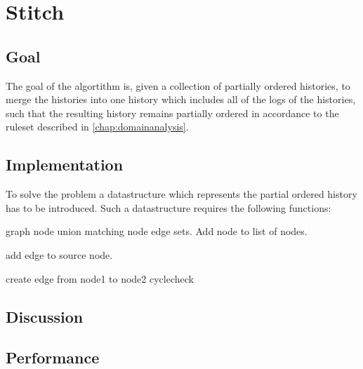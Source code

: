 \section{Stitch}
\subsection{Goal} %
The goal of the algortithm is, given a collection of partially ordered histories, to merge the histories into one history which includes all of the logs of the histories, such that the resulting history remains partially ordered in accordance to the ruleset described in \autoref{chap:domainanalysis}.


\subsection{Implementation} %
To solve the problem a datastructure which represents the partial ordered history has to be introduced. Such a datastructure requires the following functions:

\begin{algorithmic}
 {graph node}
	    \State union matching node edge sets.
	\Else
	    \State Add node to list of nodes.
	\EndIf
\EndFunction

\State\State

	\State add edge to source node.
\EndFunction

\State\State

		\State{}
	\EndFor
\EndFor
{}
				\State create edge from node1 to node2
			\EndIf
		\EndIf
	\EndFor
\EndFor
\State cyclecheck
\EndFunction
\end{algorithmic}

\subsection{Discussion} %
\subsection{Performance} %

